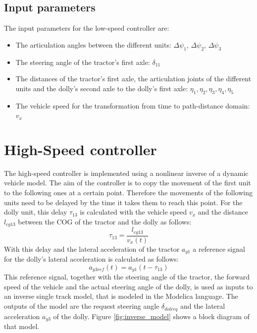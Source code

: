 \documentclass[ExampleMasters.tex]{subfiles}
\begin{document}
\subsection{Input parameters}
\label{sec:input_parameters_LS}
The input parameters for the low-speed controller are:
\begin{itemize}
	\item The articulation angles between the different units: $\Delta\psi_1$, $\Delta\psi_2$, $\Delta\psi_3$
	\item The steering angle of the tractor's first axle: $\delta_{11}$
	\item The distances of the tractor's first axle, the articulation joints of the different units and the dolly's second axle to the dolly's first axle: $\eta_1,\eta_2,\eta_3,\eta_4,\eta_5$
	\item The vehicle speed for the transformation from time to path-distance domain:  $v_x$
	
\end{itemize}

\section{High-Speed controller \cite{High-speed_paper}}
\label{sec:high-speed_controller}
The high-speed controller is implemented using a nonlinear inverse of a dynamic vehicle model.
The aim of the controller is to copy the movement of the first unit to the following ones at a certain point. Therefore the movements of the following units need to be delayed by the time it takes them to reach this point. For the dolly unit, this delay $\tau_{13}$ is calculated with the vehicle speed $v_x$ and the distance $l_{cg13}$ between the COG of the tractor and the dolly as follows:
\begin{equation}
\tau_{13}=\frac{l_{cg13}}{v_x(t)}
\end{equation}
With this delay and the lateral acceleration of the tractor $a_{y1}$ a reference signal for the dolly's lateral acceleration is calculated as follows:
\begin{equation}
a_{y3ref}(t)=a_{y1}(t-\tau_{13})
\end{equation}
This reference signal, together with the steering angle of the tractor, the forward speed of the vehicle and the actual steering angle of the dolly, is used as inputs to an inverse single track model, that is modeled in the Modelica language. The outputs of the model are the request steering angle $\delta_{dolreq}$ and the lateral acceleration $a_{y3}$ of the dolly. Figure \ref{fig:inverse_model} shows a block diagram of that model.  
\end{document}

